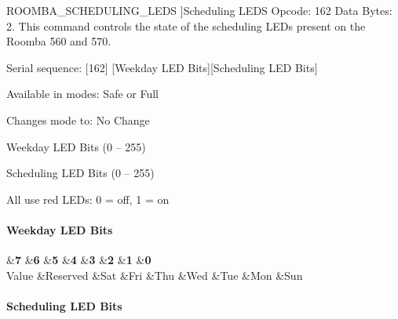 \begin{Desc}
\begin{description}
{\hypertarget{group__roomba-lib_gga305e17dfb7050ad83ea49ded2e6a2e24a86faa808c27ddad1404fa882193f0db7}{}R\+O\+O\+M\+B\+A\+\_\+\+S\+C\+H\+E\+D\+U\+L\+I\+N\+G\+\_\+\+L\+E\+D\+S\label{group__roomba-lib_gga305e17dfb7050ad83ea49ded2e6a2e24a86faa808c27ddad1404fa882193f0db7}
}]Scheduling L\+E\+D\+S Opcode\+: 162 Data Bytes\+: 2. This command controls the state of the scheduling L\+E\+Ds present on the Roomba 560 and 570.
\begin{DoxyItemize}
\item Serial sequence\+: \mbox{[}162\mbox{]} \mbox{[}Weekday L\+E\+D Bits\mbox{]}\mbox{[}Scheduling L\+E\+D Bits\mbox{]}
\item Available in modes\+: Safe or Full
\item Changes mode to\+: No Change
\item Weekday L\+E\+D Bits (0 – 255)
\item Scheduling L\+E\+D Bits (0 – 255)
\item All use red L\+E\+Ds\+: 0 = off, 1 = on
\end{DoxyItemize}

\paragraph*{Weekday L\+E\+D Bits}

\begin{TabularC}{9}
\hline
{}&{\bf 7 }&{\bf 6 }&{\bf 5 }&{\bf 4 }&{\bf 3 }&{\bf 2 }&{\bf 1 }&{\bf 0  }\\
Value &Reserved &Sat &Fri &Thu &Wed &Tue &Mon &Sun \\
\end{TabularC}
\paragraph*{Scheduling L\+E\+D Bits}


\end{description}
\end{Desc}
